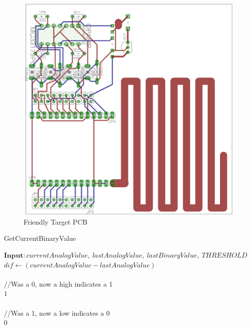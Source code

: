 \documentclass[letterpaper,10pt]{article}
\begin{document}
\begin{spacing}{1.15}
\begin{figure} [H]
	\centering
	\includegraphics[scale=1.20]{target-pcb.png}
	\caption{Friendly Target PCB\label{fig:target-pcb}}
\end{figure}



\makeatletter
\def\BState{\State\hskip-\ALG@thistlm}
\makeatother

\begin{algorithm}[H]
	\caption{GetCurrentBinaryValue}\label{algo-1}
	\begin{algorithmic}[1]
		\State $\textbf{Input}: \textit{currentAnalogValue},\ \textit{lastAnalogValue},\ \textit{lastBinaryValue},\ \textit{THRESHOLD}$\\
		
		\State $\textit{dif} \gets (\textit{currentAnalogValue} - \textit{lastAnalogValue})$\\\\
		
		
		//Was a 0, now a high indicates a 1
		 \\
		\quad \Return $1$\\\\
		
		//Was a 1, now a low indicates a 0
		 \\
		\quad \Return $0$\\\\
		

\end{algorithmic}
\end{algorithm}
\end{spacing}
\end{document}
